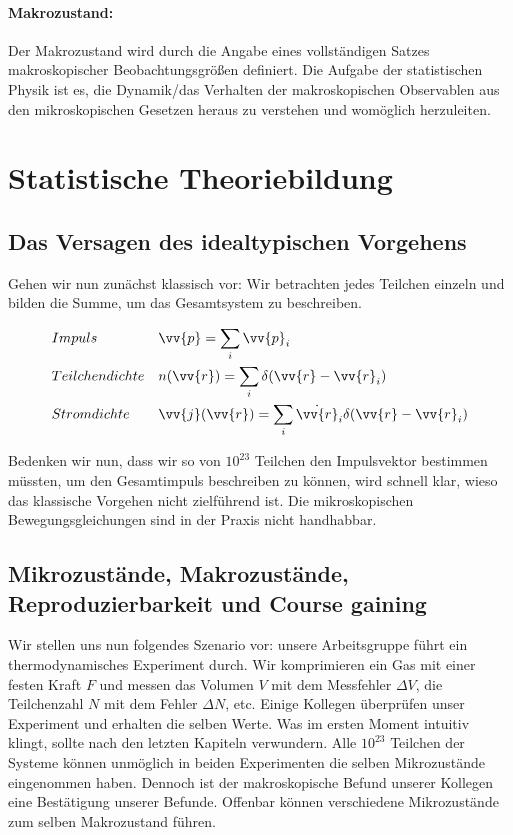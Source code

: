 \paragraph{Makrozustand:} Der Makrozustand wird durch die Angabe eines
voll\-ständigen Satzes makroskopischer Beobachtungsgrößen definiert. Die Aufgabe
der statistischen Physik ist es, die Dynamik/das Verhalten der makroskopischen
Observablen aus den mikroskopischen Gesetzen heraus zu verstehen und womöglich
herzuleiten.

    \section{Statistische Theoriebildung}
    \subsection{Das Versagen des idealtypischen Vorgehens}

Gehen wir nun zunächst klassisch vor: Wir betrachten jedes Teilchen einzeln und
bilden die Summe, um das Gesamtsystem zu beschreiben.

\begin{align*}
    &Impuls             & & \vv{p} = \sum_i \vv{p}_i\\
    &Teilchendichte     & & n( \vv{r}) = \sum_i \delta( \vv{r} - \vv{r}_i)\\
    &Stromdichte        & & \vv{j} (\vv{r}) = \sum_i \dot{\vv{r}}_i
                            \delta( \vv{r} - \vv{r}_i)
 \end{align*}

Bedenken wir nun, dass wir so von $10^{23}$ Teilchen den Impulsvektor bestimmen
müssten, um den Gesamtimpuls beschreiben zu können, wird schnell klar, wieso
das klassische Vorgehen nicht zielführend ist. Die mikroskopischen
Bewegungsgleichungen sind in der Praxis nicht handhabbar.

    \subsection{Mikrozustände, Makrozustände, Reproduzierbarkeit und Course
                gaining}

Wir stellen uns nun folgendes Szenario vor: unsere Arbeitsgruppe führt ein
thermodynamisches Experiment durch. Wir komprimieren ein Gas mit einer festen
Kraft $F$ und messen das Volumen $V$ mit dem Messfehler $\Delta V$, die
Teilchenzahl $N$ mit dem Fehler $\Delta N$, etc. Einige Kollegen überprüfen unser
Experiment und erhalten die selben Werte. Was im ersten Moment intuitiv klingt,
sollte nach den letzten Kapiteln verwundern. Alle $10^{23}$ Teilchen der Systeme
können unmöglich in beiden Experimenten die selben Mikrozustände eingenommen haben.
Dennoch ist der makroskopische Befund unserer Kollegen eine Bestätigung unserer
Befunde. Offenbar können verschiedene Mikrozustände zum selben Makrozustand führen.


